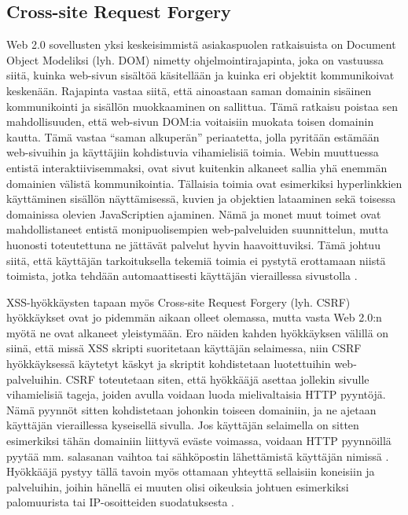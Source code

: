 \subsection{Cross-site Request Forgery}

Web 2.0 sovellusten yksi keskeisimmistä asiakaspuolen ratkaisuista on Document Object Modeliksi (lyh. DOM) nimetty ohjelmointirajapinta, joka on vastuussa siitä, 
kuinka web-sivun sisältöä käsitellään ja kuinka eri objektit kommunikoivat keskenään. Rajapinta vastaa siitä, että ainoastaan saman domainin 
sisäinen kommunikointi ja sisällön muokkaaminen on sallittua. Tämä ratkaisu poistaa sen mahdollisuuden, että web-sivun DOM:ia voitaisiin muokata toisen
domainin kautta. Tämä vastaa ``saman alkuperän'' periaatetta, jolla pyritään estämään web-sivuihin ja käyttäjiin kohdistuvia vihamielisiä toimia.
Webin muuttuessa entistä interaktiivisemmaksi, ovat sivut kuitenkin alkaneet sallia yhä enemmän domainien välistä kommunikointia. Tällaisia 
toimia ovat esimerkiksi hyperlinkkien käyttäminen sisällön näyttämisessä, kuvien ja objektien lataaminen sekä toisessa domainissa olevien 
JavaScriptien ajaminen. Nämä ja monet muut toimet ovat mahdollistaneet entistä monipuolisempien web-palveluiden suunnittelun, mutta huonosti toteutettuna 
ne jättävät palvelut hyvin haavoittuviksi. Tämä johtuu siitä, että käyttäjän tarkoituksella tekemiä toimia ei pystytä erottamaan niistä toimista, jotka tehdään 
automaattisesti käyttäjän vieraillessa sivustolla \cite{WEB2}.

XSS-hyökkäysten tapaan myös Cross-site Request Forgery (lyh. CSRF) hyökkäykset ovat jo pidemmän aikaan olleet olemassa, mutta vasta Web 2.0:n myötä ne
ovat alkaneet yleistymään. Ero näiden kahden hyökkäyksen välillä on siinä, että missä XSS skripti suoritetaan käyttäjän selaimessa, niin CSRF hyökkäyksessä käytetyt
käskyt ja skriptit kohdistetaan luotettuihin web-palveluihin. CSRF toteutetaan siten, että hyökkääjä asettaa jollekin sivulle vihamielisiä tageja, joiden
avulla voidaan luoda mielivaltaisia HTTP pyyntöjä. Nämä pyynnöt sitten kohdistetaan johonkin toiseen domainiin, ja ne ajetaan käyttäjän vieraillessa kyseisellä 
sivulla. Jos käyttäjän selaimella on sitten esimerkiksi tähän domainiin liittyvä eväste voimassa, voidaan HTTP pyynnöillä pyytää mm.  salasanan vaihtoa 
tai sähköpostin lähettämistä käyttäjän nimissä \cite{WEB2b}. Hyökkääjä pystyy tällä tavoin myös ottamaan yhteyttä sellaisiin koneisiin ja palveluihin, joihin 
hänellä ei muuten olisi oikeuksia johtuen esimerkiksi palomuurista tai IP-osoitteiden suodatuksesta \cite{CSRF}.

